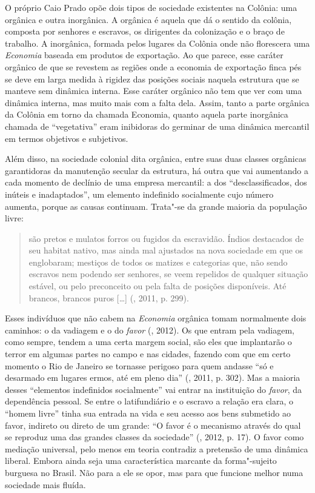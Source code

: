 O próprio Caio Prado opõe dois tipos de sociedade existentes na Colônia:
uma orgânica e outra inorgânica. A orgânica é aquela que dá o sentido da
colônia, composta por senhores e escravos, os dirigentes da colonização
e o braço de trabalho. A inorgânica, formada pelos lugares da Colônia
onde não florescera uma \emph{Economia} baseada em produtos de
exportação. Ao que parece, esse caráter orgânico de que se revestem as
regiões onde a economia de exportação finca pés se deve em larga medida
à rigidez das posições sociais naquela estrutura que se manteve sem
dinâmica interna. Esse caráter orgânico não tem que ver com uma dinâmica
interna, mas muito mais com a falta dela. Assim, tanto a parte orgânica
da Colônia em torno da chamada Economia, quanto aquela parte inorgânica
chamada de ``vegetativa'' eram inibidoras do germinar de uma dinâmica
mercantil em termos objetivos e subjetivos.

Além disso, na sociedade colonial dita orgânica, entre suas duas classes
orgânicas garantidoras da manutenção secular da estrutura, há outra que
vai aumentando a cada momento de declínio de uma empresa mercantil: a
dos ``desclassificados, dos inúteis e inadaptados'', um elemento
indefinido socialmente cujo número aumenta, porque as causas continuam.
Trata"-se da grande maioria da população livre:

\begin{quote}
são pretos e mulatos forros ou fugidos da escravidão. Índios destacados
de seu habitat nativo, mas ainda mal ajustados na nova sociedade em que
os englobaram; mestiços de todos os matizes e categorias que, não sendo
escravos nem podendo ser senhores, se veem repelidos de qualquer
situação estável, ou pelo preconceito ou pela falta de posições
disponíveis. Até brancos, brancos puros [\ldots{}] (, 2011, p.
299).
\end{quote}

Esses
indivíduos que não cabem na \emph{Economia} orgânica tomam normalmente
dois caminhos: o da vadiagem e o do \emph{favor} (, 2012). Os que
entram pela vadiagem, como sempre, tendem a uma certa margem social, são
eles que implantarão o terror em algumas partes no campo e nas cidades,
fazendo com que em certo momento o Rio de Janeiro se tornasse perigoso
para quem andasse ``só e desarmado em lugares ermos, até em pleno dia''
(, 2011, p. 302). Mas a maioria desses ``elementos indefinidos
socialmente'' vai entrar na instituição do \emph{favor}, da dependência
pessoal. Se entre o latifundiário e o escravo a relação era clara, o
``homem livre'' tinha sua entrada na vida e seu acesso aos bens
submetido ao favor, indireto ou direto de um grande: ``O favor é o
mecanismo através do qual se reproduz uma das grandes classes da
sociedade'' (, 2012, p. 17). O favor como mediação universal,
pelo menos em teoria contradiz a pretensão de uma dinâmica liberal.
Embora ainda seja uma característica marcante da forma"-sujeito burguesa
no Brasil. Não para a ele se opor, mas para que funcione melhor numa
sociedade mais fluída.

